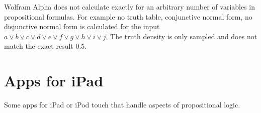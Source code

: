 \begin{itemize}
Wolfram Alpha does not calculate exactly for an arbitrary number of variables in propositional formulas.
For example no truth table, conjunctive normal form, no disjunctive normal form is calculated
for the input
\href{http://www.wolframalpha.com/input/?i=a+xor+b+xor+c+xor+d+xor+e+xor+f+xor+g+xor+h+xor+i+xor+j}{
$a\veebar b\veebar c\veebar d\veebar e\veebar f\veebar g\veebar h\veebar i\veebar j$.}
The truth density is only sampled and does not match the exact result 0.5.
\end{itemize}

\section{Apps for iPad}
 
Some apps for iPad or iPod touch that handle aspects of propositional logic.

